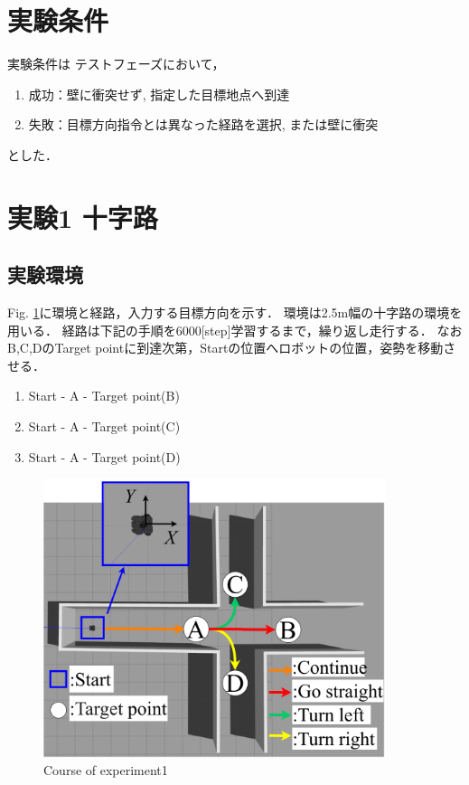\section{実験条件}
実験条件は
テストフェーズにおいて，
\begin{enumerate}
  \item 成功：壁に衝突せず, 指定した目標地点へ到達
  \item 失敗：目標方向指令とは異なった経路を選択, または壁に衝突
\end{enumerate}
とした．
\newpage
\section{実験1 十字路}
\subsection{実験環境}
Fig. \ref{fig::zyuzi}に環境と経路，入力する目標方向を示す．
環境は2.5m幅の十字路の環境を用いる．
経路は下記の手順を6000[step]学習するまで，繰り返し走行する．
なおB,C,DのTarget pointに到達次第，Startの位置へロボットの位置，姿勢を移動させる．
\begin{enumerate}
  \setlength{\parskip}{0cm} %
  \setlength{\itemsep}{0cm} %
  \item Start - A - Target point(B)
  \item Start - A - Target point(C)
  \item Start - A - Target point(D)
  \end{enumerate}

\begin{figure}[ht]
    \centering
    \includegraphics[width = 10cm]{./figs/zyuziroute.pdf}
    \caption{Course of experiment1}
    \label{fig::zyuzi}
\end{figure}

